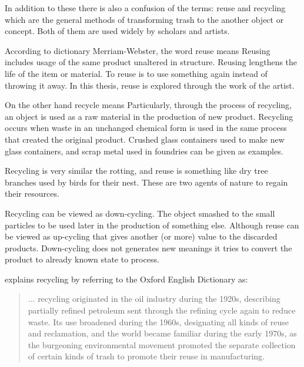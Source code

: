In addition to these there is also a confusion of the terms: reuse and recycling which are the general methods of transforming trash to the another object or concept. Both of them are used widely by scholars and artists.

According to dictionary Merriam-Webster, the word reuse means  Reusing includes usage of the same product unaltered in structure. Reusing lengthens the life of the item or material. To reuse is to use something again instead of throwing it away. In this thesis, reuse is explored through the work of the artist.

On the other hand recycle means  Particularly, through the process of recycling, an object is used as a raw material in the production of new product. Recycling occurs when waste in an unchanged chemical form is used in the same process that created the original product. Crushed glass containers used to make new glass containers, and scrap metal used in foundries can be given as examples.

Recycling is very similar the rotting, and reuse is something like dry tree branches used by birds for their nest. These are two agents of nature to regain their resources.

Recycling can be viewed as down-cycling. The object smashed to the small particles to be used later in the production of something else. Although reuse can be viewed as up-cycling that gives another (or more) value to the discarded products. Down-cycling does not generates new meanings it tries to convert the product to already known state to process. 

\citet[72]{strasser1999waste} explains recycling by referring to the Oxford English Dictionary as:
\begin{quote}
... recycling originated in the oil industry during the 1920s, describing partially refined petroleum sent through the refining cycle again to reduce waste. Its use broadened during the 1960s, designating all kinds of reuse and reclamation, and the world became familiar during the early 1970s, as the burgeoning environmental movement promoted the separate collection of certain kinds of trash to promote their reuse in manufacturing.
\end{quote}

